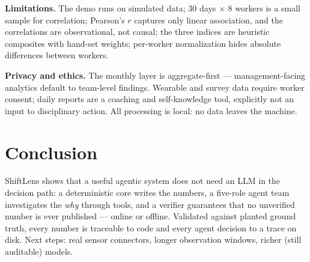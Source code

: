 \documentclass[11pt,a4paper]{article}
\begin{document}
\textbf{Limitations.} The demo runs on simulated data; $30$ days $\times$
$8$ workers is a small sample for correlation; Pearson's $r$ captures only
linear association, and the correlations are observational, not causal; the
three indices are heuristic composites with hand-set weights; per-worker
normalization hides absolute differences between workers.

\textbf{Privacy and ethics.} The monthly layer is aggregate-first ---
management-facing analytics default to team-level findings. Wearable and
survey data require worker consent; daily reports are a coaching and
self-knowledge tool, explicitly not an input to disciplinary action. All
processing is local: no data leaves the machine.

\section{Conclusion}
ShiftLens shows that a useful agentic system does not need an LLM in the
decision path: a deterministic core writes the numbers, a five-role agent
team investigates the \emph{why} through tools, and a verifier guarantees
that no unverified number is ever published --- online or offline.
Validated against planted ground truth, every number is traceable to code
and every agent decision to a trace on disk. Next steps: real sensor
connectors, longer observation windows, richer (still auditable) models.
\end{document}
